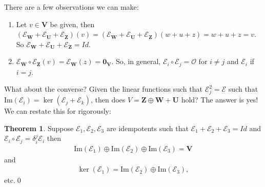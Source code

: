 \documentclass{article}
\theoremstyle{definition}
\newtheorem{thm}{Theorem}[section]
\newcommand{\V}{\mathbf{V}}
\newcommand{\W}{\mathbf{W}}
\newcommand{\Z}{\mathbf{Z}}
\newcommand{\U}{\mathbf{U}}
\newcommand{\E}{\mathcal{E}}
\newcommand{\ima}{\text{Im}}
\begin{document}
There are a few observations we can make:
\begin{enumerate}
	\item Let $v\in \V$ be given, then $(\E_\W + \E_\U + \E_\Z)(v) = (\E_\W + \E_\U + \E_\Z)(w + u + z) = w + u + z = v$. So $\E_\W + \E_\U + \E_\Z = Id$.
	
	\item $\E_\W\circ \E_\Z(v) = \E_\W(z) = \mathbf{0}_\V$. So, in general, $\E_i \circ \E_j = \mathcal{O}$ for $i \neq j$ and $\E_i$ if $i=j$.  
\end{enumerate}


What about the converse? Given the linear functions such that $\E_j^2 = \E$ such that $\ima(\E_i) = \ker(\E_j + \E_k)$, then does $V = \Z \oplus \W + \U$ hold? The answer is yes! We can restate this for rigorously:

\begin{thm}
	Suppose $\E_1, \E_2, \E_3$ are idempotents such that $\E_1 + \E_2 + \E_3 = Id$ and $\E_i \circ \E_j = \delta^j_i \E_i$ then 
	\begin{align*}
	\ima(\E_1) \oplus \ima(\E_2) \oplus \ima(\E_3) = \V
	\end{align*}
	and
	\begin{align*}
	\ker(\E_1) = \ima(\E_2) \oplus \ima(\E_3), 
	\end{align*}
	etc.\qed
\end{thm}
\end{document}
